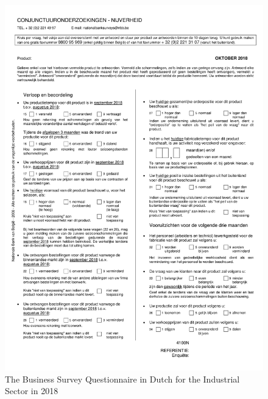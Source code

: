 \documentclass[12pt,a4paper,oneside]{book}
\begin{document}
\newpage



\newpage
\begin{figure}[H]
    \centering
    \includegraphics[scale=0.75]{Images/IndustryN.pdf}
    \caption{The Business Survey Questionnaire in Dutch for the Industrial Sector in 2018}
    \label{Questionnaire2018}
\end{figure}
\end{document}
